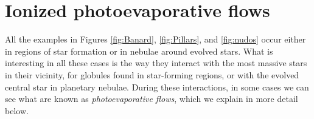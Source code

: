 \documentclass{book}
\begin{document}



\section{Ionized photoevaporative flows} 
\label{Sec:fluijos fotoevaporativos}

All the examples in Figures \ref{fig:Banard}, \ref{fig:Pillars}, and
\ref{fig:nudos} occur either in regions of star formation or in
nebulae around evolved stars. What is interesting in all these cases
is the way they interact with the most massive stars in their
vicinity, for globules found in star-forming regions, or with the
evolved central star in planetary nebulae. During these interactions,
in some cases we can see what are known as \textit{photoevaporative
  flows}, which we explain in more detail below.
\end{document}
